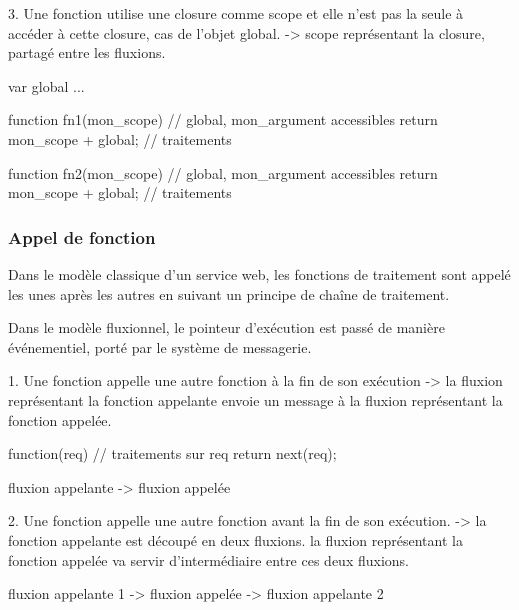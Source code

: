 			3. Une fonction utilise une closure comme scope et elle n'est pas la seule à accéder à cette closure, cas de l'objet global.
			    -> scope représentant la closure, partagé entre les fluxions.

			\begin{code}
				var global ...

				function fn1(mon_scope) {
				    // global, mon_argument accessibles
				    return mon_scope + global; // traitements
				}

				function fn2(mon_scope) {
				    // global, mon_argument accessibles
				    return mon_scope + global; // traitements
				}
			\end{code}

		\subsubsection{Appel de fonction}

			Dans le modèle classique d'un service web, les fonctions de traitement sont appelé les unes après les autres en suivant un principe de chaîne de traitement.

			Dans le modèle fluxionnel, le pointeur d'exécution est passé de manière événementiel, porté par le système de messagerie.

			1. Une fonction appelle une autre fonction à la fin de son exécution
			    -> la fluxion représentant la fonction appelante envoie un message à la fluxion représentant la fonction appelée.

			\begin{code}
				function(req) {
				    // traitements sur req
				    return next(req);
				}
			\end{code}

			fluxion appelante -> fluxion appelée

			2. Une fonction appelle une autre fonction avant la fin de son exécution.
			    -> la fonction appelante est découpé en deux fluxions.
			    la fluxion représentant la fonction appelée va servir d'intermédiaire entre ces deux fluxions.

			fluxion appelante 1 -> fluxion appelée -> fluxion appelante 2
